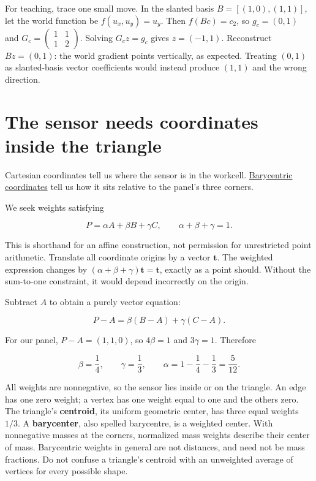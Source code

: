 For teaching, trace one small move. In the slanted basis \(B=[(1,0),(1,1)]\), let the world function be \(f(u_x,u_y)=u_y\). Then \(f(Bc)=c_2\), so \(g_c=(0,1)\) and \(G_c=\begin{pmatrix}1&1\\1&2\end{pmatrix}\). Solving \(G_cz=g_c\) gives \(z=(-1,1)\). Reconstruct \(Bz=(0,1)\): the world gradient points vertically, as expected. Treating \((0,1)\) as slanted-basis vector coefficients would instead produce \((1,1)\) and the wrong direction.

\section{The sensor needs coordinates inside the triangle}\label{01-foundations-i-ch018-the-sensor-needs-coordinates-inside-the-triangle}

Cartesian coordinates tell us where the sensor is in the workcell. \hyperref[01-foundations-i-ch018-the-sensor-needs-coordinates-inside-the-triangle]{Barycentric coordinates} tell us how it sits relative to the panel's three corners.

We seek weights satisfying

\[
P=\alpha A+\beta B+\gamma C,
\qquad \alpha+\beta+\gamma=1.
\]

This is shorthand for an affine construction, not permission for unrestricted point arithmetic. Translate all coordinate origins by a vector \(\mathbf t\). The weighted expression changes by \((\alpha+\beta+\gamma)\mathbf t=\mathbf t\), exactly as a point should. Without the sum-to-one constraint, it would depend incorrectly on the origin.

Subtract \(A\) to obtain a purely vector equation:

\[
P-A=\beta(B-A)+\gamma(C-A).
\]

For our panel, \(P-A=(1,1,0)\), so \(4\beta=1\) and \(3\gamma=1\). Therefore

\[
\beta=\frac14,\qquad\gamma=\frac13,\qquad
\alpha=1-\frac14-\frac13=\frac5{12}.
\]

All weights are nonnegative, so the sensor lies inside or on the triangle. An edge has one zero weight; a vertex has one weight equal to one and the others zero. The triangle's \textbf{centroid}, its uniform geometric center, has three equal weights \(1/3\). A \textbf{barycenter}, also spelled barycentre, is a weighted center. With nonnegative masses at the corners, normalized mass weights describe their center of mass. Barycentric weights in general are not distances, and need not be mass fractions. Do not confuse a triangle's centroid with an unweighted average of vertices for every possible shape.

